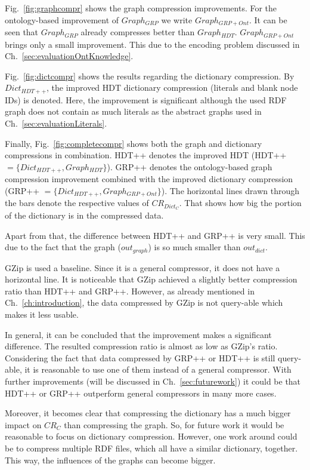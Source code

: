 \FloatBarrier
Fig.~\ref{fig:graphcompr} shows the graph compression improvements. For the ontology-based improvement of $Graph_{GRP}$ we write $Graph_{GRP+Ont}$.  It can be seen that $Graph_{GRP}$ already compresses better than $Graph_{HDT}$. $Graph_{GRP+Ont}$ brings only a small improvement. This due to the encoding problem discussed in Ch.~\ref{sec:evaluationOntKnowledge}.

Fig.~\ref{fig:dictcompr} shows the results regarding the dictionary compression. By $Dict_{HDT++}$, the improved HDT dictionary compression (literals and blank node IDs) is denoted. Here, the improvement is significant although the used RDF graph does not contain as much literals as the abstract graphs used in Ch.~\ref{sec:evaluationLiterals}. 

Finally, Fig.~\ref{fig:completecompr} shows both the graph and dictionary compressions in combination. HDT++ denotes the improved HDT (HDT++$=\{  Dict_{HDT++}, Graph_{HDT} \} $). GRP++ denotes the ontology-based graph compression improvement combined with the improved dictionary compression (GRP++ $=\{ Dict_{HDT++}, Graph_{GRP+Ont} \}$). The horizontal lines drawn through the bars denote the respective values of $CR_{Dict_C}$. That shows how big the portion of the dictionary is in the compressed data. 

Apart from that, the difference between HDT++ and GRP++ is very small. This due to the fact that the graph ($out_{graph}$) is so much smaller than $out_{dict}$.

GZip is used a baseline. Since it is a general compressor, it does not have a horizontal line. It is noticeable that GZip achieved a slightly better compression ratio than HDT++ and GRP++. However, as already mentioned in Ch.~\ref{ch:introduction}, the data compressed by GZip is not query-able which makes it less usable.

In general, it can be concluded that the improvement makes a significant difference. The resulted compression ratio is almost as low as GZip's ratio. Considering the fact that data compressed by GRP++ or HDT++ is still query-able, it is reasonable to use one of them instead of a general compressor. With further improvements (will be discussed in Ch.~\ref{sec:futurework}) it could be that HDT++ or GRP++ outperform general compressors in many more cases.

Moreover, it becomes clear that compressing the dictionary has a much bigger impact on $CR_C$ than compressing the graph. So, for future work it would be reasonable to focus on dictionary compression. However, one work around could be to compress multiple RDF files, which all have a similar dictionary, together. This way, the influences of the graphs can become bigger.



